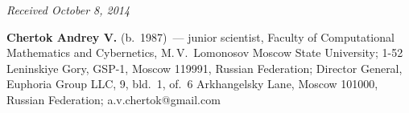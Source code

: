 \vspace*{-6pt}

\hfill{\small\textit{Received October 8, 2014}}

\vspace*{-18pt}

\Contrl

\noindent
\textbf{Chertok Andrey V.} (b.\ 1987)~---
junior scientist, Faculty of Computational Mathematics and Cybernetics,
M.\,V.~Lomonosov Moscow State University;
1-52  Leninskiye Gory, GSP-1, Moscow 119991, Russian Federation;
Director General,  Euphoria Group LLC,
 9, bld.~1, of.~6 Arkhangelsky Lane, Moscow 101000,
 Russian Federation;  a.v.chertok@gmail.com
\label{end\stat}

\renewcommand{\bibname}{\protect\rm Литература}
